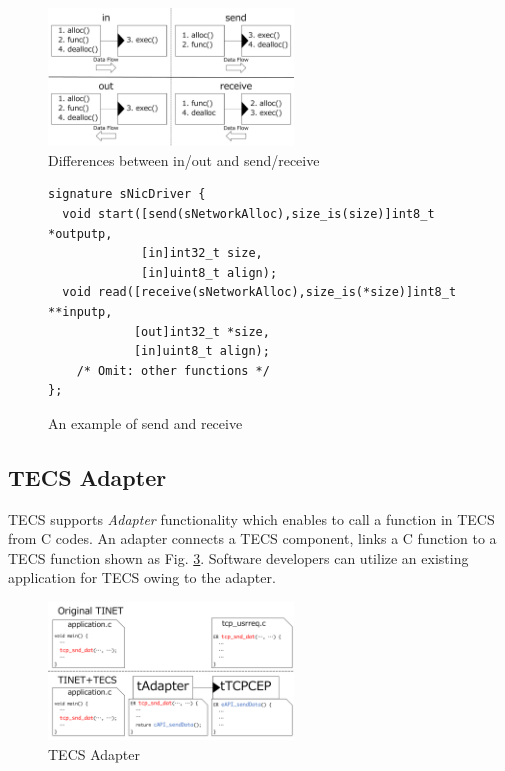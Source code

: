 \documentclass[conference]{IEEEtran/IEEEtran}
\begin{document}
\begin{figure}[t]
    \centering
    \includegraphics[width=6.5cm,clip]{figure/SendReceive.pdf}
    \caption{Differences between in/out and send/receive}
    \label{fig:SendReceive}
\end{figure}

\begin{figure}[t]
\centering
\begin{lstlisting}
signature sNicDriver {
  void start([send(sNetworkAlloc),size_is(size)]int8_t *outputp,
             [in]int32_t size,
             [in]uint8_t align);
  void read([receive(sNetworkAlloc),size_is(*size)]int8_t **inputp,
            [out]int32_t *size,
            [in]uint8_t align);
    /* Omit: other functions */
};
\end{lstlisting}
\caption{An example of send and receive}
\label{src:SendReceive}
\end{figure}


\subsection{TECS Adapter}

TECS supports {\it Adapter} functionality which enables to call a function in TECS from C codes.
An adapter connects a TECS component, links a C function to a TECS function shown as Fig. \ref{fig:TECS_Adapter}.
Software developers can utilize an existing application for TECS owing to the adapter.

\begin{figure}[t]
    \centering
    \includegraphics[width=6.5cm,clip]{figure/TECS_Adapter.pdf}
    \caption{TECS Adapter}
    \label{fig:TECS_Adapter}
\end{figure}
\end{document}
